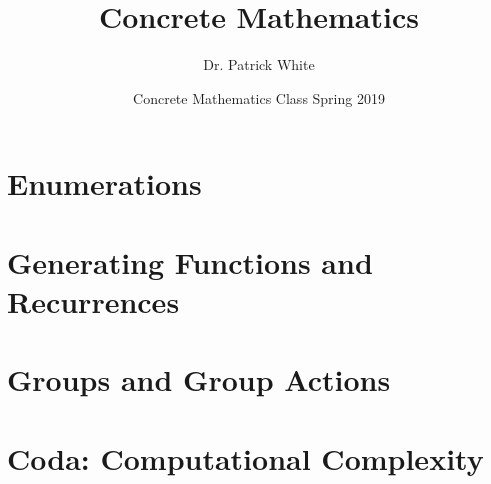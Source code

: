 \documentclass[12pt, titlepage]{article}
\title{Concrete Mathematics}
\author{Dr. Patrick White}
\date{Concrete Mathematics Class Spring 2019} %
\begin{document}
\maketitle

\tableofcontents

\newpage 



\newpage
 


\newpage 

\part{Enumerations}













 







\newpage   

\part{Generating Functions and Recurrences}
























\newpage 
\part{Groups and Group Actions}




\part{Coda: Computational Complexity}
\end{document}
